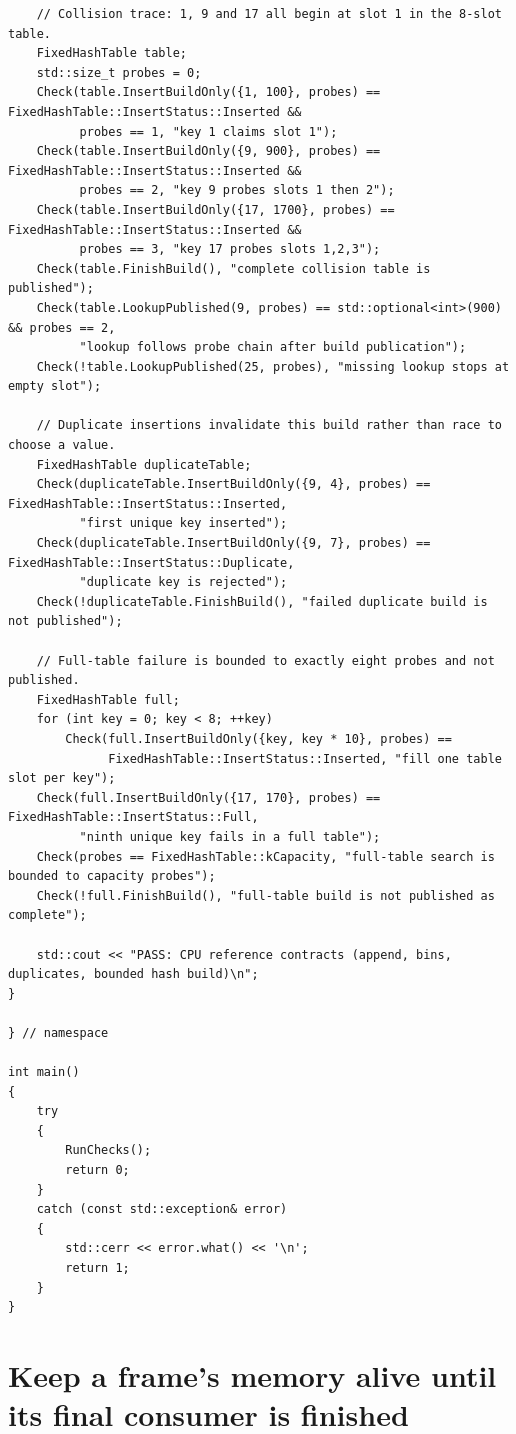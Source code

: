 \begin{verbatim}
    // Collision trace: 1, 9 and 17 all begin at slot 1 in the 8-slot table.
    FixedHashTable table;
    std::size_t probes = 0;
    Check(table.InsertBuildOnly({1, 100}, probes) == FixedHashTable::InsertStatus::Inserted &&
          probes == 1, "key 1 claims slot 1");
    Check(table.InsertBuildOnly({9, 900}, probes) == FixedHashTable::InsertStatus::Inserted &&
          probes == 2, "key 9 probes slots 1 then 2");
    Check(table.InsertBuildOnly({17, 1700}, probes) == FixedHashTable::InsertStatus::Inserted &&
          probes == 3, "key 17 probes slots 1,2,3");
    Check(table.FinishBuild(), "complete collision table is published");
    Check(table.LookupPublished(9, probes) == std::optional<int>(900) && probes == 2,
          "lookup follows probe chain after build publication");
    Check(!table.LookupPublished(25, probes), "missing lookup stops at empty slot");

    // Duplicate insertions invalidate this build rather than race to choose a value.
    FixedHashTable duplicateTable;
    Check(duplicateTable.InsertBuildOnly({9, 4}, probes) == FixedHashTable::InsertStatus::Inserted,
          "first unique key inserted");
    Check(duplicateTable.InsertBuildOnly({9, 7}, probes) == FixedHashTable::InsertStatus::Duplicate,
          "duplicate key is rejected");
    Check(!duplicateTable.FinishBuild(), "failed duplicate build is not published");

    // Full-table failure is bounded to exactly eight probes and not published.
    FixedHashTable full;
    for (int key = 0; key < 8; ++key)
        Check(full.InsertBuildOnly({key, key * 10}, probes) ==
              FixedHashTable::InsertStatus::Inserted, "fill one table slot per key");
    Check(full.InsertBuildOnly({17, 170}, probes) == FixedHashTable::InsertStatus::Full,
          "ninth unique key fails in a full table");
    Check(probes == FixedHashTable::kCapacity, "full-table search is bounded to capacity probes");
    Check(!full.FinishBuild(), "full-table build is not published as complete");

    std::cout << "PASS: CPU reference contracts (append, bins, duplicates, bounded hash build)\n";
}

} // namespace

int main()
{
    try
    {
        RunChecks();
        return 0;
    }
    catch (const std::exception& error)
    {
        std::cerr << error.what() << '\n';
        return 1;
    }
}
\end{verbatim}

\section{Keep a frame's memory alive until its final consumer is finished}\label{03-visual-computing-i-ch016-keep-a-frames-memory-alive-until-its-final-consumer-is-finished}

